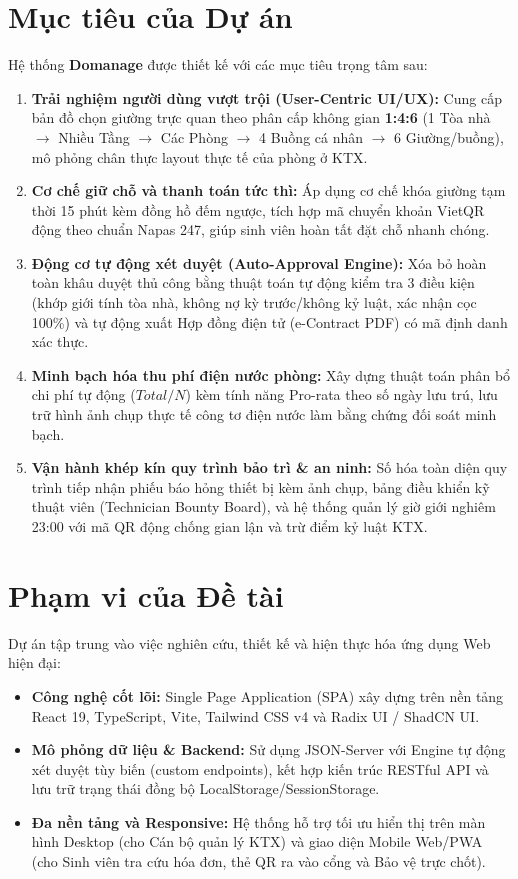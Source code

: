 \section{Mục tiêu của Dự án}
Hệ thống \textbf{Domanage} được thiết kế với các mục tiêu trọng tâm sau:
\begin{enumerate}
    \item \textbf{Trải nghiệm người dùng vượt trội (User-Centric UI/UX):} Cung cấp bản đồ chọn giường trực quan theo phân cấp không gian \textbf{1:4:6} (1 Tòa nhà $\rightarrow$ Nhiều Tầng $\rightarrow$ Các Phòng $\rightarrow$ 4 Buồng cá nhân $\rightarrow$ 6 Giường/buồng), mô phỏng chân thực layout thực tế của phòng ở KTX.
    \item \textbf{Cơ chế giữ chỗ và thanh toán tức thì:} Áp dụng cơ chế khóa giường tạm thời 15 phút kèm đồng hồ đếm ngược, tích hợp mã chuyển khoản VietQR động theo chuẩn Napas 247, giúp sinh viên hoàn tất đặt chỗ nhanh chóng.
    \item \textbf{Động cơ tự động xét duyệt (Auto-Approval Engine):} Xóa bỏ hoàn toàn khâu duyệt thủ công bằng thuật toán tự động kiểm tra 3 điều kiện (khớp giới tính tòa nhà, không nợ kỳ trước/không kỷ luật, xác nhận cọc 100\%) và tự động xuất Hợp đồng điện tử (e-Contract PDF) có mã định danh xác thực.
    \item \textbf{Minh bạch hóa thu phí điện nước phòng:} Xây dựng thuật toán phân bổ chi phí tự động ($Total / N$) kèm tính năng Pro-rata theo số ngày lưu trú, lưu trữ hình ảnh chụp thực tế công tơ điện nước làm bằng chứng đối soát minh bạch.
    \item \textbf{Vận hành khép kín quy trình bảo trì & an ninh:} Số hóa toàn diện quy trình tiếp nhận phiếu báo hỏng thiết bị kèm ảnh chụp, bảng điều khiển kỹ thuật viên (Technician Bounty Board), và hệ thống quản lý giờ giới nghiêm 23:00 với mã QR động chống gian lận và trừ điểm kỷ luật KTX.
\end{enumerate}

\section{Phạm vi của Đề tài}
Dự án tập trung vào việc nghiên cứu, thiết kế và hiện thực hóa ứng dụng Web hiện đại:
\begin{itemize}
    \item \textbf{Công nghệ cốt lõi:} Single Page Application (SPA) xây dựng trên nền tảng React 19, TypeScript, Vite, Tailwind CSS v4 và Radix UI / ShadCN UI.
    \item \textbf{Mô phỏng dữ liệu & Backend:} Sử dụng JSON-Server với Engine tự động xét duyệt tùy biến (custom endpoints), kết hợp kiến trúc RESTful API và lưu trữ trạng thái đồng bộ LocalStorage/SessionStorage.
    \item \textbf{Đa nền tảng và Responsive:} Hệ thống hỗ trợ tối ưu hiển thị trên màn hình Desktop (cho Cán bộ quản lý KTX) và giao diện Mobile Web/PWA (cho Sinh viên tra cứu hóa đơn, thẻ QR ra vào cổng và Bảo vệ trực chốt).
\end{itemize}

